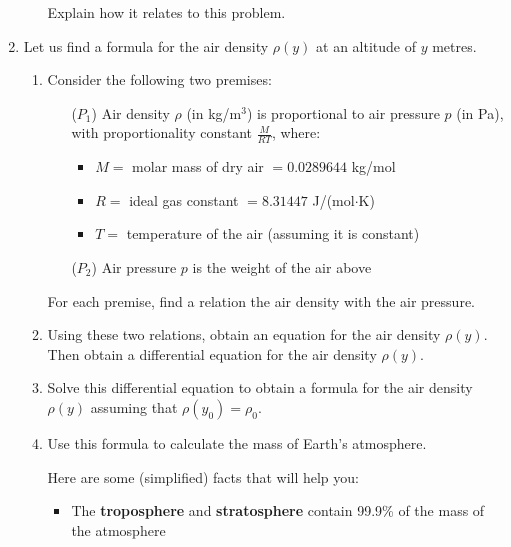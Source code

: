 \begin{enumerate}
\begin{enumerate}
	Explain how it relates to this problem.

	\end{enumerate}
	
	

\newpage

\item \label{q2} Let us find a formula for the air density $\rho(y)$ at an altitude of $y$ metres.

\begin{enumerate}

	\item Consider the following two premises:
	\begin{itemize}
		\item[($P_1$)] Air density $\rho$ (in kg/m$^3$) is proportional to air pressure $p$ (in Pa), with proportionality constant $\frac{M}{RT}$, where:
		\begin{itemize}
			\item $M = $ molar mass of dry air $= 0.0289644$ kg/mol
			\item $R = $ ideal gas constant $= 8.31447$ J/(mol$\cdot$K)
			\item $T = $ temperature of the air (assuming it is constant)
		\end{itemize}
		\item[($P_2$)] Air pressure $p$ is the weight of the air above
	\end{itemize}
	
	For each premise, find a relation the air density with the air pressure.
	
	
	\item Using these two relations, obtain an equation for the air density $\rho(y)$. Then obtain a differential equation for the air density $\rho(y)$.
	
	
	\item Solve this differential equation to obtain a formula for the air density $\rho(y)$ assuming that $\rho(y_0) = \rho_0$.
	
	
	\item Use this formula to calculate the mass of Earth's atmosphere.
	
	\begin{minipage}{.7\textwidth}
	Here are some (simplified) facts that will help you:
	\begin{itemize}
		\item The \textbf{troposphere} and \textbf{stratosphere} contain 99.9\% of the mass of the atmosphere\\
	

\end{itemize}
\end{minipage}
\end{enumerate}
\end{enumerate}

